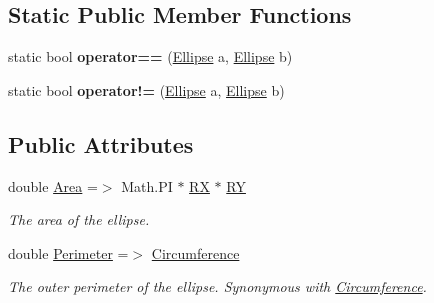 \subsection*{Static Public Member Functions}
\begin{DoxyCompactItemize}
\item 
\mbox{\label{class_s_g_l_1_1_ellipse_a972329f722dcc91f3f56fb8906ee1177}} 
static bool {\bfseries operator==} (\mbox{\hyperlink{class_s_g_l_1_1_ellipse}{Ellipse}} a, \mbox{\hyperlink{class_s_g_l_1_1_ellipse}{Ellipse}} b)
\item 
\mbox{\label{class_s_g_l_1_1_ellipse_af5e66ec61f3fbbd363bbd3cf52482841}} 
static bool {\bfseries operator!=} (\mbox{\hyperlink{class_s_g_l_1_1_ellipse}{Ellipse}} a, \mbox{\hyperlink{class_s_g_l_1_1_ellipse}{Ellipse}} b)
\end{DoxyCompactItemize}
\subsection*{Public Attributes}
\begin{DoxyCompactItemize}
\item 
double \mbox{\hyperlink{class_s_g_l_1_1_ellipse_a8259d2766fa4d206859cdc874100517b}{Area}} =$>$ Math.\+PI $\ast$ \mbox{\hyperlink{class_s_g_l_1_1_ellipse_ac6630cfb928ba11742a1efefe7ed41ca}{RX}} $\ast$ \mbox{\hyperlink{class_s_g_l_1_1_ellipse_af1df83b66e02fb6ebf969e608fc018d9}{RY}}
\begin{DoxyCompactList}\small\item\em The area of the ellipse. \end{DoxyCompactList}\item 
double \mbox{\hyperlink{class_s_g_l_1_1_ellipse_a3f9ecf8407c0b189ca037c4d51306786}{Perimeter}} =$>$ \mbox{\hyperlink{class_s_g_l_1_1_ellipse_ac8c377f7d5e0efb4ca338e67fede6450}{Circumference}}
\begin{DoxyCompactList}\small\item\em The outer perimeter of the ellipse. Synonymous with \mbox{\hyperlink{class_s_g_l_1_1_ellipse_ac8c377f7d5e0efb4ca338e67fede6450}{Circumference}}. \end{DoxyCompactList}\end{DoxyCompactItemize}
